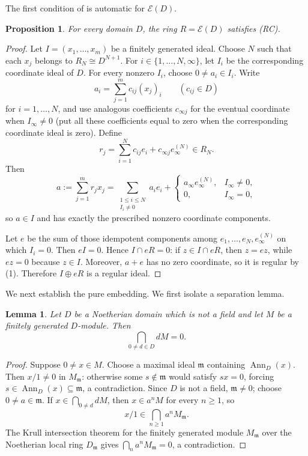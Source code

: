 \documentclass[11pt]{article}
\newtheorem{proposition}[proposition]{Proposition}
\newtheorem{lemma}[lemma]{Lemma}
\theoremstyle{definition}
\theoremstyle{remark}
\newcommand{\Ann}{\operatorname{Ann}}
\newcommand{\EC}{\mathcal E}
\begin{document}
The first condition of  is automatic for $\EC(D)$.

\begin{proposition}\label{prop:RCED}
For every domain $D$, the ring $R=\EC(D)$ satisfies \textup{(RC)}.
\end{proposition}

\begin{proof}
Let $I=(x_1,\ldots,x_m)$ be a finitely generated ideal.  Choose $N$ such that
each $x_j$ belongs to $R_N\cong D^{N+1}$.  For
$i\in\{1,\ldots,N,\infty\}$, let $I_i$ be the corresponding coordinate ideal
of $D$.  For every nonzero $I_i$, choose $0\ne a_i\in I_i$.  Write
\[
 a_i=\sum_{j=1}^m c_{ij}(x_j)_i\qquad(c_{ij}\in D)
\]
for $i=1,\ldots,N$, and use analogous coefficients $c_{\infty j}$ for the
eventual coordinate when $I_\infty\ne0$ (put all these coefficients equal to
zero when the corresponding coordinate ideal is zero).  Define
\[
 r_j=\sum_{i=1}^N c_{ij}e_i+c_{\infty j}e_\infty^{(N)}\in R_N.
\]
Then
\[
 a:=\sum_{j=1}^m r_jx_j
 =\sum_{\substack{1\le i\le N\\ I_i\ne0}}a_ie_i
   +\begin{cases}
      a_\infty e_\infty^{(N)},& I_\infty\ne0,\\
      0,&I_\infty=0,
    \end{cases}
\]
so $a\in I$ and has exactly the prescribed nonzero coordinate components.

Let $e$ be the sum of those idempotent components among
$e_1,\ldots,e_N,e_\infty^{(N)}$ on which $I_i=0$.  Then $eI=0$.  Hence
$I\cap eR=0$: if $z\in I\cap eR$, then $z=ez$, while $ez=0$ because
$z\in I$.  Moreover, $a+e$ has no zero coordinate, so it is regular by
(1).  Therefore $I\oplus eR$ is a regular ideal.
\end{proof}

We next establish the pure embedding.  We first isolate a separation lemma.

\begin{lemma}\label{lem:Dseparated}
Let $D$ be a Noetherian domain which is not a field and let $M$ be a finitely
generated $D$-module.  Then
\[
 \bigcap_{0\ne d\in D} dM=0.
\]
\end{lemma}

\begin{proof}
Suppose $0\ne x\in M$.  Choose a maximal ideal $\mathfrak m$ containing
$\Ann_D(x)$.  Then $x/1\ne0$ in $M_{\mathfrak m}$: otherwise some
$s\notin\mathfrak m$ would satisfy $sx=0$, forcing
$s\in\Ann_D(x)\subseteq\mathfrak m$, a contradiction.  Since $D$ is not a
field, $\mathfrak m\ne0$; choose $0\ne a\in\mathfrak m$.  If
$x\in\bigcap_{0\ne d}dM$, then $x\in a^nM$ for every $n\ge1$, so
\[
 x/1\in\bigcap_{n\ge1}a^nM_{\mathfrak m}.
\]
The Krull intersection theorem for the finitely generated module
$M_{\mathfrak m}$ over the Noetherian local ring $D_{\mathfrak m}$ gives
$\bigcap_na^nM_{\mathfrak m}=0$, a contradiction.
\end{proof}
\end{document}
